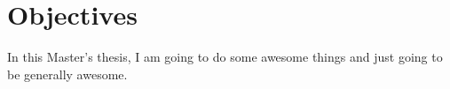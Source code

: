 \section{Objectives}
\label{sec:int_objectives}

In this Master's thesis, I am going to do some awesome things and just going to be generally awesome.